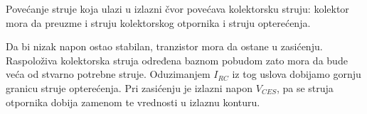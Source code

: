 Povećanje struje koja ulazi u izlazni čvor povećava kolektorsku struju: kolektor mora da preuzme i struju kolektorskog otpornika i struju opterećenja.

Da bi nizak napon ostao stabilan, tranzistor mora da ostane u zasićenju. Raspoloživa kolektorska struja određena baznom pobudom zato mora da bude veća od stvarno potrebne struje. Oduzimanjem $I_{RC}$ iz tog uslova dobijamo gornju granicu struje opterećenja. Pri zasićenju je izlazni napon $V_{CES}$, pa se struja otpornika dobija zamenom te vrednosti u izlaznu konturu.
